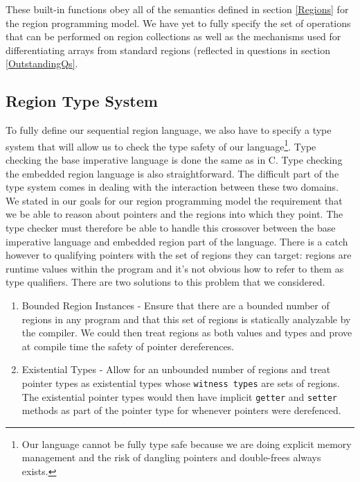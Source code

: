 \documentclass{article}
\theoremstyle{definition}
\begin{document}
These built-in functions obey all of the semantics defined in section \ref{Regions} for the
region programming model.  We have yet to fully specify the set of operations that can be performed
on region collections as well as the mechanisms used for differentiating arrays from standard
regions (reflected in questions in section \ref{OutstandingQs}.

\subsection{Region Type System \label{TypeSystem}}
\noindent
To fully define our sequential region language, we also have to specify a type
system that will allow us to check the type safety of our language\footnote{Our
language cannot be fully type safe because we are doing explicit memory management
and the risk of dangling pointers and double-frees always exists.}.  Type checking
the base imperative language is done the same as in C.  Type checking the embedded
region language is also straightforward.  The difficult part of the type system comes 
in dealing with the interaction between these two domains. \\

\noindent
We stated in our goals for our region programming model the requirement that we
be able to reason about pointers and the regions into which they point.  The
type checker must therefore be able to handle this crossover between the base
imperative language and embedded region part of the language. 
There is a catch however to qualifying pointers with the set of regions they 
can target: regions are runtime values within the program and it's not obvious
how to refer to them as type qualifiers.  There are two solutions
to this problem that we considered.

\begin{enumerate}
\item Bounded Region Instances - Ensure that there are a bounded number of regions in
any program and that this set of regions is statically analyzable by the compiler.  We
could then treat regions as both values and types and prove at compile time the safety
of pointer dereferences.
\item Existential Types\cite{Pierce02} - Allow for an unbounded number of regions 
and treat pointer types as existential types whose {\tt witness types} are sets of regions.
The existential pointer types would then have implicit {\tt getter} and {\tt setter}
methods as part of the pointer type for whenever pointers were derefenced.  
\end{enumerate}
\end{document}
